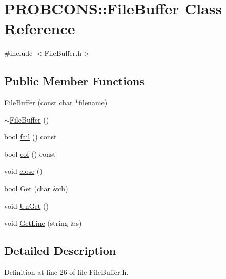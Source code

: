 \hypertarget{class_p_r_o_b_c_o_n_s_1_1_file_buffer}{\section{P\+R\+O\+B\+C\+O\+N\+S\+:\+:File\+Buffer Class Reference}
\label{class_p_r_o_b_c_o_n_s_1_1_file_buffer}
}


{\ttfamily \#include $<$File\+Buffer.\+h$>$}

\subsection*{Public Member Functions}
\begin{DoxyCompactItemize}
\item 
\hyperlink{class_p_r_o_b_c_o_n_s_1_1_file_buffer_abb9d988c796afd08091ff689b2ca1eb5}{File\+Buffer} (const char $\ast$filename)
\item 
\hyperlink{class_p_r_o_b_c_o_n_s_1_1_file_buffer_aa1f6b1f1db55a091450af21fd2a2db26}{$\sim$\+File\+Buffer} ()
\item 
bool \hyperlink{class_p_r_o_b_c_o_n_s_1_1_file_buffer_a2862067101705c942338d09773cee1f8}{fail} () const 
\item 
bool \hyperlink{class_p_r_o_b_c_o_n_s_1_1_file_buffer_ac6d73686698e1a25fe33f7ba945c490c}{eof} () const 
\item 
void \hyperlink{class_p_r_o_b_c_o_n_s_1_1_file_buffer_a9ef63162d1417dd978cf8dde34f4e24b}{close} ()
\item 
bool \hyperlink{class_p_r_o_b_c_o_n_s_1_1_file_buffer_af2ce2a32c9234f4d51d36c97da478963}{Get} (char \&ch)
\item 
void \hyperlink{class_p_r_o_b_c_o_n_s_1_1_file_buffer_ae903c231f24ed9eb3dd22173e7620077}{Un\+Get} ()
\item 
void \hyperlink{class_p_r_o_b_c_o_n_s_1_1_file_buffer_a01f6c43967612fcb43de72642cce84d7}{Get\+Line} (string \&s)
\end{DoxyCompactItemize}


\subsection{Detailed Description}


Definition at line 26 of file File\+Buffer.\+h.



